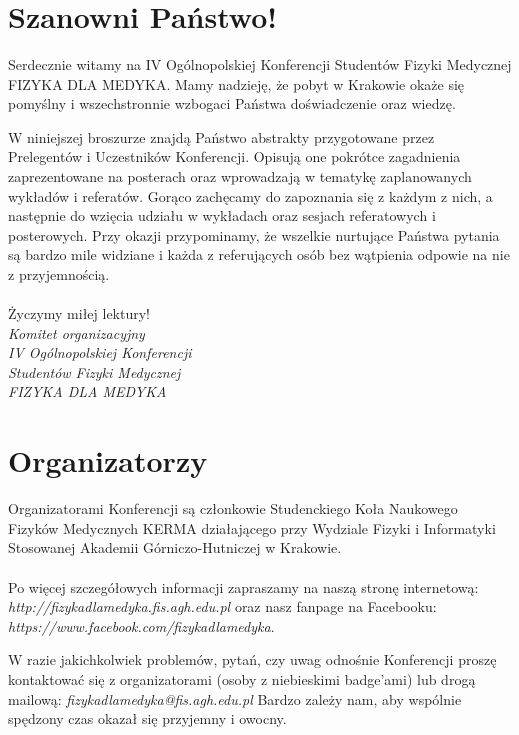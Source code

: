 \documentclass[12pt, a4paper]{article}
\begin{document}
\title{ }
\author{ }
\date {}

\thispagestyle{title}

\section*{Szanowni Państwo!} 

\hspace{0.7 cm}Serdecznie witamy na IV Ogólnopolskiej Konferencji Studentów Fizyki Medycznej FIZYKA DLA MEDYKA. Mamy nadzieję, że pobyt w Krakowie okaże się pomyślny i wszechstronnie wzbogaci Państwa doświadczenie oraz wiedzę. 
\newline

W niniejszej broszurze znajdą Państwo abstrakty przygotowane przez Prelegentów i Uczestników Konferencji. Opisują one pokrótce zagadnienia zaprezentowane na posterach oraz wprowadzają  w tematykę zaplanowanych wykładów i referatów. Gorąco zachęcamy do zapoznania się z każdym z nich, a następnie do wzięcia udziału w wykładach oraz sesjach referatowych i posterowych. Przy okazji przypominamy, że wszelkie nurtujące Państwa pytania są bardzo mile widziane i każda z referujących osób bez wątpienia odpowie na nie z przyjemnością.
\\
\\
Życzymy miłej lektury! \\ 
\textit{Komitet organizacyjny \\IV Ogólnopolskiej Konferencji \\Studentów Fizyki Medycznej \\FIZYKA DLA MEDYKA}

\section*{Organizatorzy}

Organizatorami Konferencji są członkowie Studenckiego Koła Naukowego Fizyków Medycznych KERMA działającego przy Wydziale Fizyki i Informatyki Stosowanej Akademii Górniczo-Hutniczej w Krakowie. 
\\
\\
Po więcej szczegółowych informacji zapraszamy na naszą stronę internetową: \newline
\textit{http://fizykadlamedyka.fis.agh.edu.pl} \newline
oraz nasz fanpage na Facebooku: \newline
\textit{https://www.facebook.com/fizykadlamedyka}.

W razie jakichkolwiek problemów, pytań, czy uwag odnośnie Konferencji proszę kontaktować się z organizatorami (osoby z niebieskimi badge'ami) lub drogą mailową:\newline
\textit{fizykadlamedyka@fis.agh.edu.pl}\newline
Bardzo zależy nam, aby wspólnie spędzony czas okazał się przyjemny i owocny.
\end{document}
